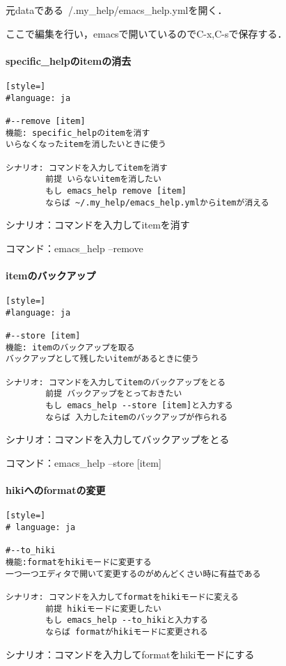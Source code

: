 元dataである~/.my\_help/emacs\_help.ymlを開く．

ここで編集を行い，emacsで開いているのでC-x,C-sで保存する．

\paragraph{specific\_helpのitemの消去}\begin{lstlisting}[style=]
#language: ja

#--remove [item]
機能: specific_helpのitemを消す
いらなくなったitemを消したいときに使う

シナリオ: コマンドを入力してitemを消す
        前提 いらないitemを消したい
        もし emacs_help remove [item]
        ならば ~/.my_help/emacs_help.ymlからitemが消える

\end{lstlisting}
シナリオ：コマンドを入力してitemを消す

コマンド：emacs\_help --remove

\paragraph{itemのバックアップ}\begin{lstlisting}[style=]
#language: ja

#--store [item]
機能: itemのバックアップを取る
バックアップとして残したいitemがあるときに使う

シナリオ: コマンドを入力してitemのバックアップをとる
        前提 バックアップをとっておきたい
        もし emacs_help --store [item]と入力する
        ならば 入力したitemのバックアップが作られる
\end{lstlisting}
シナリオ：コマンドを入力してバックアップをとる

コマンド：emacs\_help --store [item]

\paragraph{hikiへのformatの変更}\begin{lstlisting}[style=]
# language: ja

#--to_hiki
機能:formatをhikiモードに変更する
一つ一つエディタで開いて変更するのがめんどくさい時に有益である

シナリオ: コマンドを入力してformatをhikiモードに変える
        前提 hikiモードに変更したい
        もし emacs_help --to_hikiと入力する
        ならば formatがhikiモードに変更される
\end{lstlisting}
シナリオ：コマンドを入力してformatをhikiモードにする

